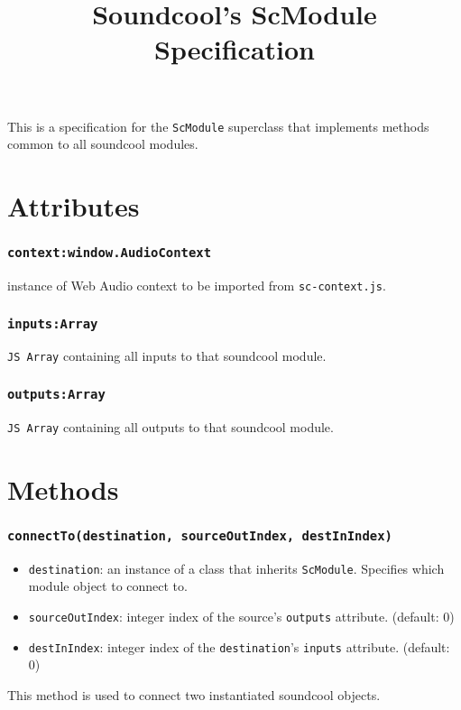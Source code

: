 \documentclass[20pt]{article}
\begin{document}
\title{Soundcool's ScModule Specification}
\maketitle

This is a specification for the \texttt{ScModule} superclass that implements methods common to all soundcool modules.
\section*{Attributes}
\subsubsection*{\texttt{context:window.AudioContext}}
instance of Web Audio context to be imported from \texttt{sc-context.js}.
\subsubsection*{\texttt{inputs:Array}}
\texttt{JS Array} containing all inputs to that soundcool module.  
\subsubsection*{\texttt{outputs:Array}}
\texttt{JS Array} containing all outputs to that soundcool module.


\section*{Methods}
\subsubsection*{\texttt{connectTo(destination, sourceOutIndex, destInIndex)}}
\begin{itemize}
\item \texttt{destination}: an instance of a class that inherits \texttt{ScModule}. Specifies which module object to connect to.
\item \texttt{sourceOutIndex}: integer index of the source's \texttt{outputs} attribute. (default: 0)
\item \texttt{destInIndex}: integer index of the \texttt{destination}'s \texttt{inputs} attribute. (default: 0)
\end{itemize}
This method is used to connect two instantiated soundcool objects.
\end{document}
